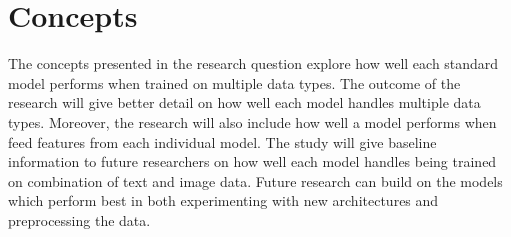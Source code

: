 
\section{Concepts}
The concepts presented in the research question explore how well each standard model performs when trained on multiple data types.  The outcome of the research will give better detail on how well each model handles multiple data types.  Moreover, the research will also include how well a model performs when feed features from each individual model.  The study will give baseline information to future researchers on how well each model handles being trained on combination of text and image data.  Future research can build on the models which perform best in both experimenting with new architectures and preprocessing the data.




